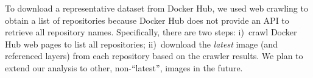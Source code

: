 To download a representative dataset from Docker Hub, 
we used web crawling to obtain a list of repositories
because Docker Hub does not provide an API to retrieve all repository names.
%
%
Specifically, there are two steps: i)~crawl Docker Hub web pages to list all
repositories; ii)~download the \textit{latest} image (and referenced layers)
from each repository based on the crawler results.
%
%
We plan to extend our analysis to other, non-``latest'', images in the future.
%
%
%
%
